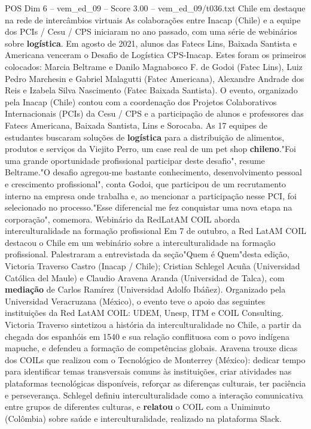 \begin{textsample}{POS Dim 6 – vem\_ed\_09 – Score 3.00 – vem\_ed\_09/t036.txt}  \label{ex:f6_pos_132}
Chile em destaque na rede de intercâmbios virtuais As colaborações entre Inacap (Chile) e a equipe dos PCIs / Cesu / CPS iniciaram no ano passado, com uma série de webinários sobre \textbf{logística}.
Em agosto de 2021, alunos das Fatecs Lins, Baixada Santista e Americana venceram o Desafio de Logística CPS-Inacap.
Estes foram os primeiros colocados: Marcia Beltrame e Danilo Magnabosco F. de Godoi (Fatec Lins), Luiz Pedro Marchesin e Gabriel Malagutti (Fatec Americana), Alexandre Andrade dos Reis e Izabela Silva Nascimento (Fatec Baixada Santista).
O evento, organizado pela Inacap (Chile) contou com a coordenação dos Projetos Colaborativos Internacionais (PCIs) da Cesu / CPS e a participação de alunos e professores das Fatecs Americana, Baixada Santista, Lins e Sorocaba.
As 17 equipes de estudantes buscaram soluções de \textbf{logística} para a distribuição de alimentos, produtos e serviços da Viejito Perro, um case real de um pet shop \textbf{chileno}."Foi uma grande oportunidade profissional participar deste desafio", resume Beltrame."O desafio agregou-me bastante conhecimento, desenvolvimento pessoal e crescimento profissional", conta Godoi, que participou de um recrutamento interno na empresa onde trabalha e, ao mencionar a participação nesse PCI, foi selecionado no processo."Esse diferencial me fez conquistar uma nova etapa na corporação", comemora.
Webinário da RedLatAM COIL aborda interculturalidade na formação profissional Em 7 de outubro, a Red LatAM COIL destacou o Chile em um webinário sobre a interculturalidade na formação profissional.
Palestraram a entrevistada da seção"Quem é Quem"desta edição, Victoria Traverso Castro (Inacap / Chile); Cristian Schlegel Acuña (Universidad Católica del Maule) e Claudio Aravena Aranda (Universidad de Talca), com \textbf{mediação} de Carlos Ramírez (Universidad Adolfo Ibáñez).
Organizado pela Universidad Veracruzana (México), o evento teve o apoio das seguintes instituições da Red LatAM COIL: UDEM, Unesp, ITM e COIL Consulting.
Victoria Traverso sintetizou a história da interculturalidade no Chile, a partir da chegada dos espanhóis em 1540 e sua relação conflituosa com o povo indígena mapuche, e defendeu a formação de competências globais.
Aravena trouxe dicas dos COILs que realizou com o Tecnológico de Monterrey (México): dedicar tempo para identificar temas transversais comuns às instituições, criar atividades nas plataformas tecnológicas disponíveis, reforçar as diferenças culturais, ter paciência e perseverança.
Schlegel definiu interculturalidade como a interação comunicativa entre grupos de diferentes culturas, e \textbf{relatou} o COIL com a Uniminuto (Colômbia) sobre saúde e interculturalidade, realizado na plataforma Slack.

\end{textsample}
